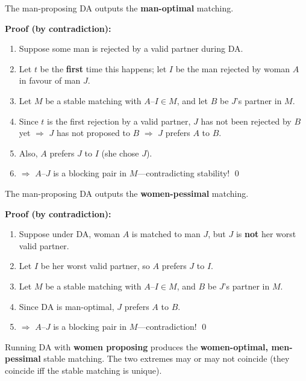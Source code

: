 \begin{thmbox}
The man-proposing DA outputs the \textbf{man-optimal} matching.

\textbf{Proof (by contradiction):}
\begin{enumerate}
  \item Suppose some man is rejected by a valid partner during DA.
  \item Let $t$ be the \textbf{first} time this happens; let $I$ be the man rejected by woman $A$ in favour of man $J$.
  \item Let $M$ be a stable matching with $A$--$I \in M$, and let $B$ be $J$'s partner in $M$.
  \item Since $t$ is the first rejection by a valid partner, $J$ has not been rejected by $B$ yet $\Rightarrow$ $J$ has not proposed to $B$ $\Rightarrow$ $J$ prefers $A$ to $B$.
  \item Also, $A$ prefers $J$ to $I$ (she chose $J$).
  \item $\Rightarrow$ $A$--$J$ is a blocking pair in $M$---contradicting stability! \qed
\end{enumerate}
\end{thmbox}

\begin{thmbox}
The man-proposing DA outputs the \textbf{women-pessimal} matching.

\textbf{Proof (by contradiction):}
\begin{enumerate}
  \item Suppose under DA, woman $A$ is matched to man $J$, but $J$ is \textbf{not} her worst valid partner.
  \item Let $I$ be her worst valid partner, so $A$ prefers $J$ to $I$.
  \item Let $M$ be a stable matching with $A$--$I \in M$, and $B$ be $J$'s partner in $M$.
  \item Since DA is man-optimal, $J$ prefers $A$ to $B$.
  \item $\Rightarrow$ $A$--$J$ is a blocking pair in $M$---contradiction! \qed
\end{enumerate}
\end{thmbox}

\begin{tipbox}
Running DA with \textbf{women proposing} produces the \textbf{women-optimal, men-pessimal} stable matching. The two extremes may or may not coincide (they coincide iff the stable matching is unique).
\end{tipbox}


